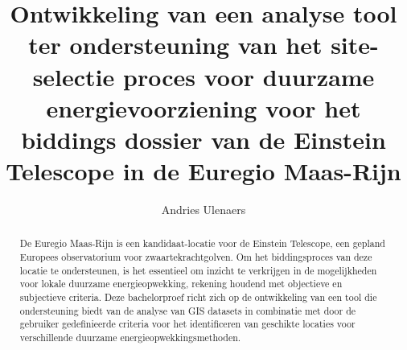 \documentclass{hogent-article}
\title{Ontwikkeling van een analyse tool ter ondersteuning van het site-\-selectie proces voor duurzame energievoorziening voor het biddings dossier van de Einstein Telescope in de Euregio Maas-\-Rijn}
\author{Andries Ulenaers}
\begin{document}
\begin{abstract}
  De Euregio Maas-\-Rijn is een kandidaat-\-locatie voor de Einstein Telescope, een gepland Europees observatorium voor zwaartekrachtgolven. Om het biddingsproces van deze locatie te ondersteunen, is het essentieel om inzicht te verkrijgen in de mogelijkheden voor lokale duurzame energieopwekking, rekening houdend met objectieve en subjectieve criteria. Deze bachelorproef richt zich op de ontwikkeling van een tool die ondersteuning biedt van de analyse van GIS datasets in combinatie met door de gebruiker gedefinieerde criteria voor het identificeren van geschikte locaties voor verschillende duurzame energieopwekkingsmethoden.
\end{abstract}

\tableofcontents



\printbibliography[heading=bibintoc]
\end{document}
